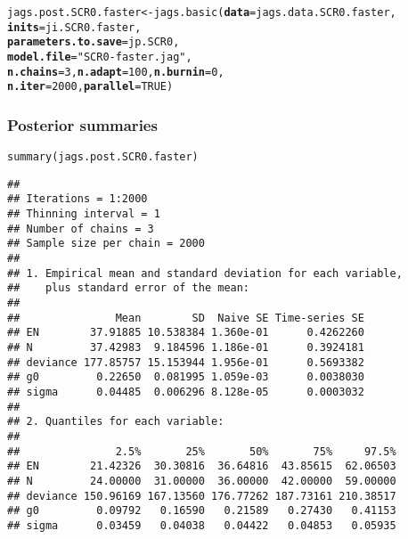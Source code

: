 \documentclass[color=usenames,dvipsnames]{beamer}\usepackage[]{graphicx}\usepackage[]{xcolor}
\makeatletter
\newcommand{\hlnum}[1]{\textcolor[rgb]{0.69,0.494,0}{#1}}%
\newcommand{\hlsng}[1]{\textcolor[rgb]{0.749,0.012,0.012}{#1}}%
\newcommand{\hldef}[1]{\textcolor[rgb]{0,0,0}{#1}}%
\newcommand{\hlkwb}[1]{\textcolor[rgb]{0,0.341,0.682}{#1}}%
\newcommand{\hlkwc}[1]{\textcolor[rgb]{0,0,0}{\textbf{#1}}}%
\newcommand{\hlkwd}[1]{\textcolor[rgb]{0.004,0.004,0.506}{#1}}%
\newenvironment{kframe}{%
 \def\at@end@of@kframe{}%
 \ifinner\ifhmode%
  \def\at@end@of@kframe{\end{minipage}}%
  \begin{minipage}{\columnwidth}%
 \fi\fi%
 \def\FrameCommand##1{\hskip\@totalleftmargin \hskip-\fboxsep
 \colorbox{shadecolor}{##1}\hskip-\fboxsep
     \hskip-\linewidth \hskip-\@totalleftmargin \hskip\columnwidth}%
 \MakeFramed {\advance\hsize-\width
   \@totalleftmargin\z@ \linewidth\hsize
   \@setminipage}}%
 {\par\unskip\endMakeFramed%
 \at@end@of@kframe}
\newenvironment{knitrout}{}{} %
\let\hlstd\hldef
\let\hlstr\hlsng
\makeatother
\begin{document}
\begin{frame}[fragile]
\begin{knitrout}
\begin{kframe}
\begin{alltt}
\hlstd{jags.post.SCR0.faster} \hlkwb{<-} \hlkwd{jags.basic}\hlstd{(}\hlkwc{data}\hlstd{=jags.data.SCR0.faster,}
                                    \hlkwc{inits}\hlstd{=ji.SCR0.faster,}
                                    \hlkwc{parameters.to.save}\hlstd{=jp.SCR0,}
                                    \hlkwc{model.file}\hlstd{=}\hlstr{"SCR0-faster.jag"}\hlstd{,}
                                    \hlkwc{n.chains}\hlstd{=}\hlnum{3}\hlstd{,} \hlkwc{n.adapt}\hlstd{=}\hlnum{100}\hlstd{,} \hlkwc{n.burnin}\hlstd{=}\hlnum{0}\hlstd{,}
                                    \hlkwc{n.iter}\hlstd{=}\hlnum{2000}\hlstd{,} \hlkwc{parallel}\hlstd{=}\hlnum{TRUE}\hlstd{)}
\end{alltt}
\end{kframe}
\end{knitrout}
\end{frame}




\begin{frame}[fragile]
  \frametitle{Posterior summaries}
\begin{knitrout}\tiny
{}\color{fgcolor}\begin{kframe}
\begin{alltt}
\hlkwd{summary}\hldef{(jags.post.SCR0.faster)}
\end{alltt}
\begin{verbatim}
## 
## Iterations = 1:2000
## Thinning interval = 1 
## Number of chains = 3 
## Sample size per chain = 2000 
## 
## 1. Empirical mean and standard deviation for each variable,
##    plus standard error of the mean:
## 
##               Mean        SD  Naive SE Time-series SE
## EN        37.91885 10.538384 1.360e-01      0.4262260
## N         37.42983  9.184596 1.186e-01      0.3924181
## deviance 177.85757 15.153944 1.956e-01      0.5693382
## g0         0.22650  0.081995 1.059e-03      0.0038030
## sigma      0.04485  0.006296 8.128e-05      0.0003032
## 
## 2. Quantiles for each variable:
## 
##               2.5%       25%       50%       75%     97.5%
## EN        21.42326  30.30816  36.64816  43.85615  62.06503
## N         24.00000  31.00000  36.00000  42.00000  59.00000
## deviance 150.96169 167.13560 176.77262 187.73161 210.38517
## g0         0.09792   0.16590   0.21589   0.27430   0.41153
## sigma      0.03459   0.04038   0.04422   0.04853   0.05935
\end{verbatim}
\end{kframe}
\end{knitrout}
\end{frame}
\end{document}
